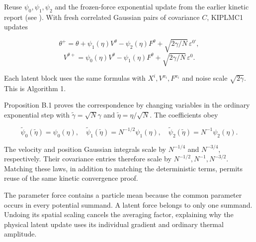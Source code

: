\documentclass[11pt,a4paper]{report}
\begin{document}
Reuse \(\psi_0,\psi_1,\psi_2\) and the frozen-force exponential update from the earlier kinetic report (see \cite[Section~3.12.2]{LangevinLean2026Kinetic}). With fresh
correlated Gaussian pairs of covariance \(C\), KIPLMC1 updates


\[\theta^+=\theta+\psi_1(\eta)V^\theta-\psi_2(\eta)F^\theta
+\sqrt{2\gamma/N}\,\varepsilon^{0\prime},\]
\[V^{\theta+}=\psi_0(\eta)V^\theta-\psi_1(\eta)F^\theta
+\sqrt{2\gamma/N}\,\varepsilon^0.\]


Each latent block uses the same formulas with \(X^i,V^{x_i},F^{x_i}\)
and noise scale \(\sqrt{2\gamma}\). This is Algorithm 1.




Proposition B.1 proves the correspondence by changing variables in the
ordinary exponential step with \(\widetilde\gamma=\sqrt N\gamma\) and
\(\widetilde\eta=\eta/\sqrt N\). The coefficients obey


\[\widetilde\psi_0(\widetilde\eta)=\psi_0(\eta),\quad
\widetilde\psi_1(\widetilde\eta)=N^{-1/2}\psi_1(\eta),\quad
\widetilde\psi_2(\widetilde\eta)=N^{-1}\psi_2(\eta).\]


The velocity and position Gaussian integrals scale by \(N^{-1/4}\) and
\(N^{-3/4}\), respectively. Their covariance entries therefore scale by
\(N^{-1/2},N^{-1},N^{-3/2}\). Matching these laws, in addition to matching
the deterministic terms, permits reuse of the same kinetic convergence proof.



The parameter force contains a particle mean because the common parameter occurs in every potential summand. A latent force belongs to only one summand. Undoing its spatial scaling cancels the averaging factor, explaining why the physical latent update uses its individual gradient and ordinary thermal amplitude.
\end{document}

